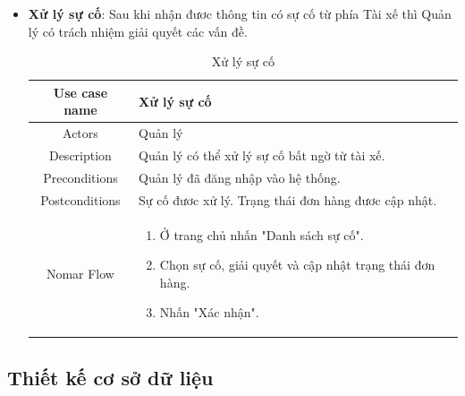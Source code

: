 \begin{itemize}
\begin{itemize}
			\newpage
		
			\item \textbf{Xử lý sự cố}: Sau khi nhận đươc thông tin có sự cố từ phía Tài xế thì Quản lý có trách nhiệm giải quyết các vấn đề. 
			
			\begin{table}[!htp]
				\centering\begin{tabular}{|c|m{25em}|}
					\hline 
					Use case name & Xử lý sự cố\\ 
					\hline 
					Actors & Quản lý \\ 
					\hline
					Description & Quản lý có thể xử lý sự cố bất ngờ từ tài xế. \\
					\hline 
					Preconditions & Quản lý đã đăng nhập vào hệ thống. \\
					\hline
					Postconditions & Sự cố đươc xử lý. Trạng thái đơn hàng đươc cập nhật. \\
					\hline
					Nomar Flow & \begin{enumerate}
						\item Ở trang chủ nhấn "Danh sách sự cố".
						\item Chọn sự cố, giải quyết và cập nhật trạng thái đơn hàng.
						\item Nhấn "Xác nhận".
					\end{enumerate}
					\\
					\hline
				\end{tabular}
				\caption{Xử lý sự cố}
			\end{table}
			
			
		\end{itemize}
	\end{itemize}
	

    
	
	\subsection{Thiết kế cơ sở dữ liệu}
	

